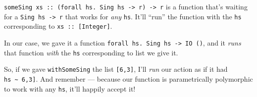 \documentclass[]{article}
\newenvironment{Shaded}{}{}
\newcommand{\KeywordTok}[1]{\textcolor[rgb]{0.00,0.44,0.13}{\textbf{{#1}}}}
\newcommand{\DataTypeTok}[1]{\textcolor[rgb]{0.56,0.13,0.00}{{#1}}}
\newcommand{\DecValTok}[1]{\textcolor[rgb]{0.25,0.63,0.44}{{#1}}}
\newcommand{\StringTok}[1]{\textcolor[rgb]{0.25,0.44,0.63}{{#1}}}
\newcommand{\CommentTok}[1]{\textcolor[rgb]{0.38,0.63,0.69}{\textit{{#1}}}}
\newcommand{\OtherTok}[1]{\textcolor[rgb]{0.00,0.44,0.13}{{#1}}}
\newcommand{\FunctionTok}[1]{\textcolor[rgb]{0.02,0.16,0.49}{{#1}}}
\newcommand{\NormalTok}[1]{{#1}}
\begin{document}
\begin{Shaded}
\end{Shaded}

\texttt{someSing\ xs\ ::\ (forall\ hs.\ Sing\ hs\ -\textgreater{}\ r)\ -\textgreater{}\ r}
is a function that's waiting for a \texttt{Sing\ hs\ -\textgreater{}\ r} that
works for \emph{any} \texttt{hs}. It'll ``run'' the function with the
\texttt{hs} corresponding to \texttt{xs\ ::\ {[}Integer{]}}.

In our case, we gave it a function
\texttt{forall\ hs.\ Sing\ hs\ -\textgreater{}\ IO\ ()}, and it \emph{runs} that
function \emph{with} the \texttt{hs} corresponding to list we give it.

So, if we gave \texttt{withSomeSing} the list \texttt{{[}6,3{]}}, I'll
\emph{run} our action as if it had
\texttt{hs\ \textasciitilde{}\ \textquotesingle{}{[}6,3{]}}. And remember ---
because our function is parametrically polymorphic to work with any \texttt{hs},
it'll happily accept it!
\end{document}
